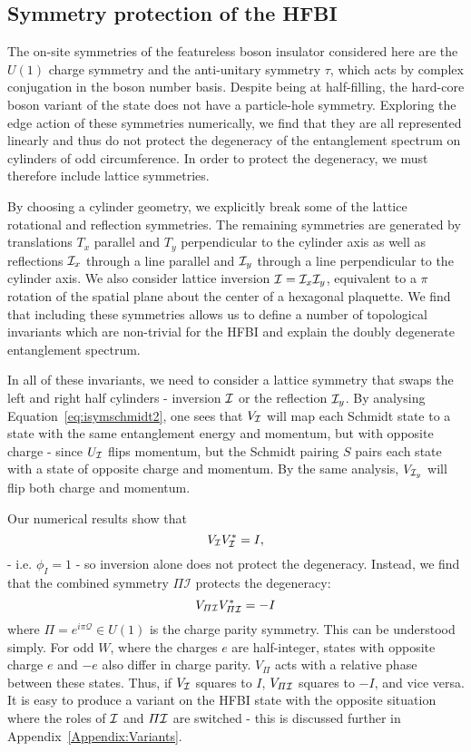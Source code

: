 \subsection{Symmetry protection of the HFBI}

The on-site symmetries of the featureless boson insulator considered here
are the $U(1)$ charge symmetry and the 
anti-unitary symmetry $\tau$, which acts by complex conjugation in the boson number basis.
Despite being at half-filling, the hard-core boson variant of the state does not have a particle-hole
symmetry. Exploring the edge action of these symmetries numerically, we find that they are all
represented linearly and thus do not protect the degeneracy of the entanglement spectrum
on cylinders of odd circumference.
In order to protect the degeneracy, we must therefore include lattice symmetries.

By choosing a cylinder geometry, we explicitly break some of the lattice rotational
and reflection symmetries. The remaining symmetries are generated by
translations $T_x$ parallel and $T_y$ perpendicular to the cylinder axis
as well as reflections $\mathcal{I}_x$ through a line parallel and $\mathcal{I}_y$ through a line perpendicular to 
the cylinder axis. We also consider lattice inversion $\mathcal{I} = \mathcal{I}_x \mathcal{I}_y$, equivalent to a $\pi$ 
rotation of the spatial plane about the center of a hexagonal plaquette. We find that including
these symmetries allows us to define a number of topological invariants which are non-trivial
for the HFBI and explain the doubly degenerate entanglement spectrum.

In all of these invariants, we need to consider a lattice symmetry that swaps the
left and right half cylinders - inversion $\mathcal{I}$ or the reflection $\mathcal{I}_y$.
By analysing Equation~\ref{eq:isymschmidt2}, one sees that $V_{\mathcal{I}}$ will map each Schmidt 
state to a state with the same entanglement energy and momentum, but with opposite charge -
since $U_{\mathcal{I}}$ flips momentum, but the Schmidt pairing $S$ pairs each state with a state of
opposite charge and momentum. By the same analysis, $V_{\mathcal{I}_y}$ will flip both charge and momentum.



Our numerical results show that 
$$
V_{\mathcal{I}} V_{\mathcal{I}}^* = I, 
$$
- i.e. $\phi_{I} = 1$ -
so inversion alone does not protect the degeneracy. Instead, we find that the
combined symmetry $\varPi \mathcal{I}$ protects the degeneracy:
$$
V_{\varPi \mathcal{I}} V_{\varPi \mathcal{I}}^* = -I 
$$
where $\varPi = e^{i \pi \mathcal{Q}} \in U(1)$ is the charge parity symmetry.
This can be understood simply. For odd $W$, where the charges $e$ are half-integer,
states with opposite charge $e$ and $-e$ also differ in charge parity. $V_{\varPi}$
acts with a relative phase between these states. Thus, if $V_{\mathcal{I}}$ squares
to $I$, $V_{\varPi \mathcal{I}}$ squares to $-I$, and vice versa.  
It is easy to produce a variant on the HFBI state with the opposite situation where
the roles of $\mathcal{I}$ and $\varPi \mathcal{I}$ are switched - this is discussed further in 
Appendix~\ref{Appendix:Variants}.

